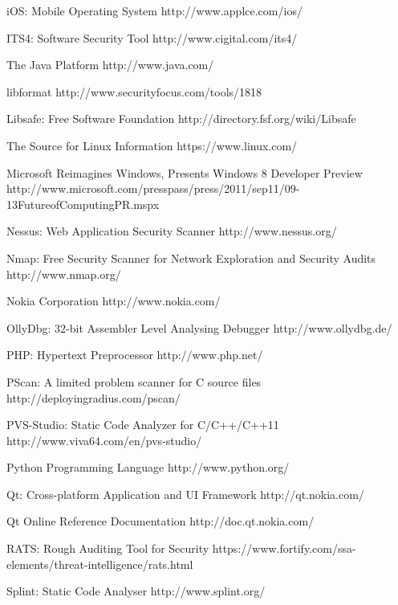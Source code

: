 \begin{thebibliography}{9}
		{iOS: Mobile Operating System}
		{http://www.applce.com/ios/}

		{ITS4: Software Security Tool}
		{http://www.cigital.com/its4/}

		{The Java Platform}
		{http://www.java.com/}
	
		{libformat}
		{http://www.securityfocus.com/tools/1818}

		{Libsafe: Free Software Foundation}
		{http://directory.fsf.org/wiki/Libsafe}

		{The Source for Linux Information}
		{https://www.linux.com/}

		{Microsoft Reimagines Windows, Presents Windows 8 Developer Preview}
		{http://www.microsoft.com/presspass/press/2011/sep11/09-13FutureofComputingPR.mspx}

		{Nessus: Web Application Security Scanner}
		{http://www.nessus.org/}

		{Nmap: Free Security Scanner for Network Exploration and Security Audits}
		{http://www.nmap.org/}

		{Nokia Corporation}
		{http://www.nokia.com/}

		{OllyDbg: 32-bit Assembler Level Analysing Debugger}
		{http://www.ollydbg.de/}

		{PHP: Hypertext Preprocessor}
		{http://www.php.net/}

		{PScan: A limited problem scanner for C source files}
		{http://deployingradius.com/pscan/}

		{PVS-Studio: Static Code Analyzer for C/C++/C++11}
		{http://www.viva64.com/en/pvs-studio/}

		{Python Programming Language}
		{http://www.python.org/}
		
		{Qt: Cross-platform Application and UI Framework}
		{http://qt.nokia.com/}

		{Qt Online Reference Documentation}
		{http://doc.qt.nokia.com/}

		{RATS: Rough Auditing Tool for Security}
		{https://www.fortify.com/ssa-elements/threat-intelligence/rats.html}

		{Splint: Static Code Analyser}
		{http://www.splint.org/}
	

\end{thebibliography}
